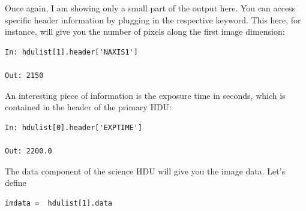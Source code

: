 \documentclass[twocolumn,apj]{openjournal}
\begin{document}
Once again, I am showing only a small part of the output here. You can access specific header information by plugging in the respective keyword. This here, for instance, will give you the number of pixels along the first image dimension:
\begin{lstlisting}
In: hdulist[1].header['NAXIS1']

Out: 2150
\end{lstlisting}
An interesting piece of information is the exposure time in seconds, which is contained in the header of the primary HDU:
\begin{lstlisting}
In: hdulist[0].header['EXPTIME']

Out: 2200.0
\end{lstlisting}
The data component of the science HDU will give you the image data. Let's define
\begin{lstlisting}
imdata =  hdulist[1].data
\end{lstlisting}
\end{document}
